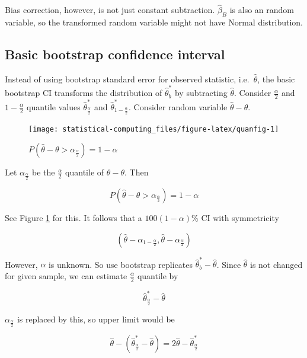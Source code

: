 \documentclass[]{book}
\theoremstyle{definition}
\theoremstyle{definition}
\theoremstyle{definition}
\theoremstyle{remark}
\begin{document}
Bias correction, however, is not just constant subtraction. \(\hat\beta_B\) is also an random variable, so the transformed random variable might not have Normal distribution.

\hypertarget{basic-bootstrap-confidence-interval}{%
\subsection{Basic bootstrap confidence interval}\label{basic-bootstrap-confidence-interval}}

Instead of using bootstrap standard error for observed statistic, i.e.~\(\hat\theta\), the basic bootstrap CI transforms the distribution of \(\hat\theta_b^{\ast}\) by subtracting \(\hat\theta\). Consider \(\frac{\alpha}{2}\) and \(1 - \frac{\alpha}{2}\) quantile values \(\hat\theta_{\frac{\alpha}{2}}^{\ast}\) and \(\hat\theta_{1 - \frac{\alpha}{2}}^{\ast}\). Consider random variable \(\hat\theta - \theta\).

\begin{figure}[H]

{\centering \texttt{[image: statistical-computing\_files/figure-latex/quanfig-1]} 

}

\caption{$P(\hat\theta - \theta > \alpha_{\frac{\alpha}{2}}) = 1 - \alpha$}\label{fig:quanfig}
\end{figure}

Let \(\alpha_{\frac{\alpha}{2}}\) be the \(\frac{\alpha}{2}\) quantile of \(\hat\theta - \theta\). Then

\[P(\hat\theta - \theta > \alpha_{\frac{\alpha}{2}}) = 1 - \alpha\]

See Figure \ref{fig:quanfig} for this. It follows that a \(100(1 - \alpha)\%\) CI with symmetricity

\[(\hat\theta - \alpha_{1- \frac{\alpha}{2}}, \hat\theta - \alpha_{\frac{\alpha}{2}})\]

However, \(\alpha\) is unknown. So use bootstrap replicates \(\hat\theta_b^{\ast} - \hat\theta\). Since \(\hat\theta\) is not changed for given sample, we can estimate \(\frac{\alpha}{2}\) quantile by

\[\hat\theta_{\frac{\alpha}{2}}^{\ast} - \hat\theta\]

\(\alpha_{\frac{\alpha}{2}}\) is replaced by this, so upper limit would be

\[\hat\theta - (\hat\theta_{\frac{\alpha}{2}}^{\ast} - \hat\theta) = 2 \hat\theta - \hat\theta_{\frac{\alpha}{2}}^{\ast}\]
\end{document}
